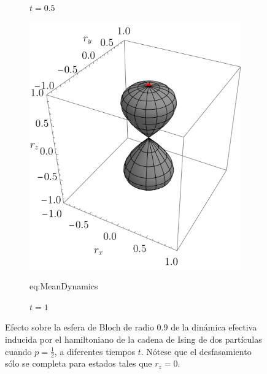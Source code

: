 \begin{figure}[ht!]
\begin{subfigure}{0.32\textwidth}
      \caption{$t=0.5$}
    \end{subfigure}
    \begin{subfigure}{0.32\textwidth}
      \centering
      \includegraphics[width=0.9\linewidth]{chapter4/figures_special/sphere_Ising_t=1._z=0.9_p=0.5.png}
      \caption{$t=1$}eq:MeanDynamics
    \end{subfigure}
    \caption{Efecto sobre la esfera de Bloch de radio $0.9$ de la dinámica efectiva inducida por el hamiltoniano de la cadena de Ising de dos partículas cuando $p=\frac{1}{2}$, a diferentes tiempos $t$. Nótese que el desfasamiento sólo se completa para estados tales que $r_{z}=0$.\label{fig:Ising_p0.5_Sequence}}
\end{figure}




